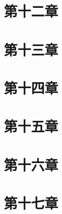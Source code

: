 \documentclass[12pt,a4paper,oneside,openany]{book}
\begin{document}
\chapter{第十二章}


\chapter{第十三章}


\chapter{第十四章}


\chapter{第十五章}


\chapter{第十六章}


\chapter{第十七章}

\end{document}
